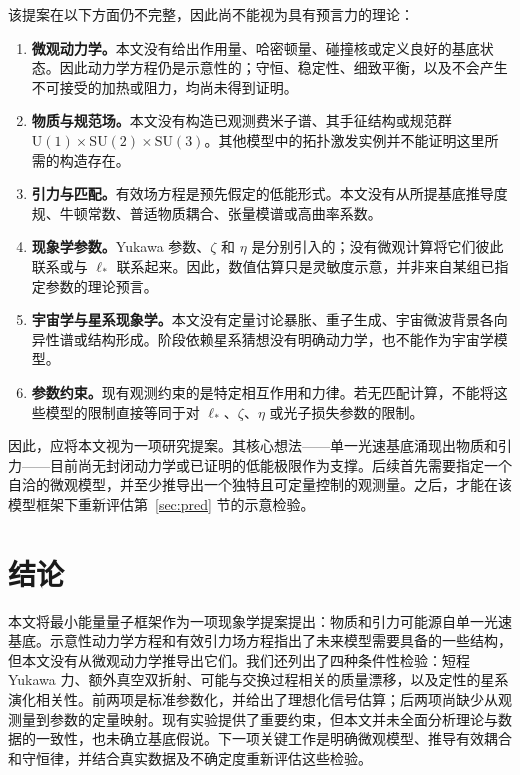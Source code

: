 \documentclass[UTF8,fontset=none,11pt,a4paper]{ctexart}
\begin{document}
该提案在以下方面仍不完整，因此尚不能视为具有预言力的理论：
\begin{enumerate}
\item \textbf{微观动力学。}本文没有给出作用量、哈密顿量、碰撞核或定义良好的基底状态。因此动力学方程仍是示意性的；守恒、稳定性、细致平衡，以及不会产生不可接受的加热或阻力，均尚未得到证明。
\item \textbf{物质与规范场。}本文没有构造已观测费米子谱、其手征结构或规范群 $\mathrm{U}(1)\times\mathrm{SU}(2)\times\mathrm{SU}(3)$。其他模型中的拓扑激发实例并不能证明这里所需的构造存在。
\item \textbf{引力与匹配。}有效场方程是预先假定的低能形式。本文没有从所提基底推导度规、牛顿常数、普适物质耦合、张量模谱或高曲率系数。
\item \textbf{现象学参数。}Yukawa 参数、$\zeta$ 和 $\eta$ 是分别引入的；没有微观计算将它们彼此联系或与 $\ell_\ast$ 联系起来。因此，数值估算只是灵敏度示意，并非来自某组已指定参数的理论预言。
\item \textbf{宇宙学与星系现象学。}本文没有定量讨论暴胀、重子生成、宇宙微波背景各向异性谱或结构形成。阶段依赖星系猜想没有明确动力学，也不能作为宇宙学模型。
\item \textbf{参数约束。}现有观测约束的是特定相互作用和力律。若无匹配计算，不能将这些模型的限制直接等同于对 $\ell_\ast$、$\zeta$、$\eta$ 或光子损失参数的限制。
\end{enumerate}
因此，应将本文视为一项研究提案。其核心想法——单一光速基底涌现出物质和引力——目前尚无封闭动力学或已证明的低能极限作为支撑。后续首先需要指定一个自洽的微观模型，并至少推导出一个独特且可定量控制的观测量。之后，才能在该模型框架下重新评估第~\ref{sec:pred} 节的示意检验。

\section{结论}\label{sec:conclusion}

本文将最小能量量子框架作为一项现象学提案提出：物质和引力可能源自单一光速基底。示意性动力学方程和有效引力场方程指出了未来模型需要具备的一些结构，但本文没有从微观动力学推导出它们。我们还列出了四种条件性检验：短程 Yukawa 力、额外真空双折射、可能与交换过程相关的质量漂移，以及定性的星系演化相关性。前两项是标准参数化，并给出了理想化信号估算；后两项尚缺少从观测量到参数的定量映射。现有实验提供了重要约束，但本文并未全面分析理论与数据的一致性，也未确立基底假说。下一项关键工作是明确微观模型、推导有效耦合和守恒律，并结合真实数据及不确定度重新评估这些检验。

\appendix
\end{document}
